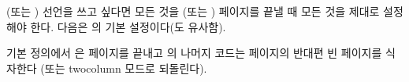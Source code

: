 \cmd{\nopartblankpage} (또는 \cmd{\nobookblankpage}) 선언을 쓰고 싶다면 모든 것을
\cmd{\part} (또는 \cmd{\book}) 페이지를 끝낼 때 모든 것을 제대로 설정해야 한다.
다음은 \cmd{\partpageend}의 기본 설정이다(\cmd{\bookpageend}도 유사함).

\begin{lcode}
\newcommand{\partpageend}{%
  \afterpartskip
  \ifm@mnopartnewpage%
  \else%
    \if@twoside
      \if@openright%
        \null
        \thispagestyle{afterpart}%
        \newpage
      \fi
    \fi
  \fi
  \if@tempswa%
    \twocolumn
  \fi}
\end{lcode}
기본 정의에서 \cmd{\afterpartskip}은 \cmd{\part} 페이지를 끝내고
\cmd{\partpageend}의 나머지 코드는 \cmd{\part} 페이지의 반대편 빈 페이지를
식자한다 (또는 twocolumn 모드로 되돌린다).

